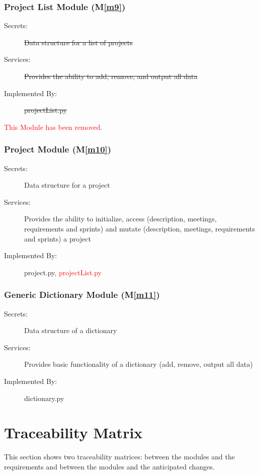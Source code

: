 \documentclass[12pt, titlepage]{article}
\newcommand{\mref}[1]{M\ref{#1}}
\begin{document}
\subsubsection{Project List Module (\mref{m9})}
\begin{description}
    \item[Secrets:] \sout{Data structure for a list of projects}
    \item[Services:] \sout{Provides the ability to add, remove, and output all data}
    \item[Implemented By:] \sout{projectList.py}
\end{description}
\textcolor{red}{This Module has been removed.}

\subsubsection{Project Module (\mref{m10})}
\begin{description}
    \item[Secrets:] Data structure for a project
    \item[Services:] Provides the ability to initialize, access (description, meetings, requirements and sprints) and mutate (description, meetings, requirements and sprints) a project
    \item[Implemented By:] project.py\textcolor{red}{, projectList.py}
\end{description}

\subsubsection{Generic Dictionary Module (\mref{m11})}
\begin{description}
    \item[Secrets:] Data structure of a dictionary
    \item[Services:] Provides basic functionality of a dictionary (add, remove, output all data)
    \item[Implemented By:] dictionary.py
\end{description}

\section{Traceability Matrix} \label{SecTM}

This section shows two traceability matrices: between the modules and the
requirements and between the modules and the anticipated changes.
\end{document}
